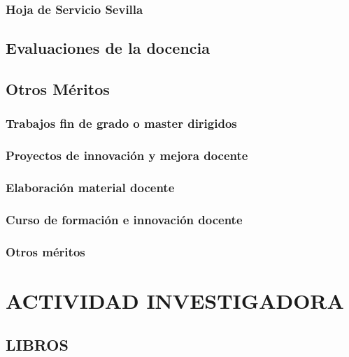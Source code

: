 \subsubsection{Hoja de Servicio Sevilla}
\startitems
{}
\stopitems

\subsection{Evaluaciones de la docencia}
\startitems
\printTeachingQuality
\stopitems
 
\subsection{Otros Méritos}
\subsubsection{Trabajos fin de grado o master dirigidos}
\startitems
{}
\stopitems

\subsubsection{Proyectos de innovación y mejora docente}
\startitems
{}
\stopitems 
 
\subsubsection{Elaboración material docente}
\startitems
{}
\stopitems

\subsubsection{Curso de formación e innovación docente}
\startitems
{}
\stopitems
 
\subsubsection{Otros méritos}
\startitems
{}
\stopitems
 
\section{ACTIVIDAD INVESTIGADORA}
\subsection{LIBROS} 
\startitems
{} 
\stopitems
 
